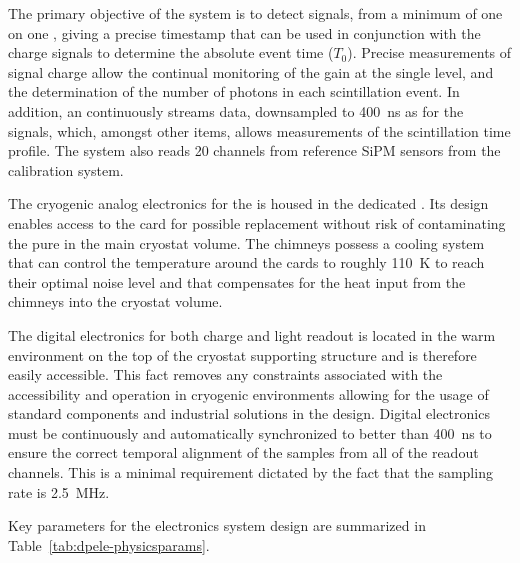 The primary objective of the  system is to detect signals, from a minimum of one \phel on one , giving a precise timestamp that can be used in conjunction with the charge signals to determine the absolute event time ($T_0$). 
Precise measurements of  signal charge allow the continual monitoring of the  gain at the single \phel level, and the determination of the number of photons in each scintillation event.  In addition, an   continuously streams data, downsampled to \SI{400}{ns} as for the  signals,  which, amongst other items, allows measurements of the scintillation time profile. The  system also reads \num{20} channels from reference SiPM sensors from the  calibration system.

The cryogenic analog electronics for the  is housed in the dedicated . %
Its design %
enables access to the  card for possible replacement without %
risk of contaminating the pure \lar in the main cryostat volume. The chimneys %
possess a cooling system that can control the temperature around the  cards to roughly \SI{110}{\kelvin} %
to reach their optimal noise level and %
that compensates for the heat input from the chimneys into the cryostat volume. 

The digital electronics for both charge and light readout is located in the warm environment on the top of the cryostat supporting structure and is therefore easily accessible. This fact removes any constraints associated with the accessibility and operation in cryogenic environments allowing for the usage of standard components and industrial solutions in the design. Digital electronics must be continuously and automatically synchronized to better than \SI{400}{\nano\s} to ensure the correct temporal alignment of the  samples from all of the readout channels. This is a minimal requirement dictated by the fact that the sampling rate is \SI{2.5}{\MHz}.  

Key parameters for the electronics system design are summarized in Table~\ref{tab:dpele-physicsparams}. %

